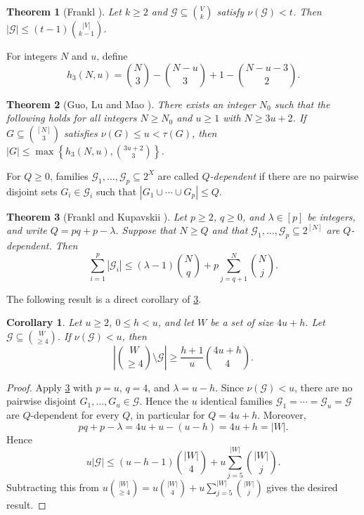 \documentclass[10pt,a4paper]{article}
\numberwithin{equation}{section}
\newtheorem{theorem}{Theorem}[section]
\newtheorem{corollary}[corollary]{Corollary}
\theoremstyle{definition}
\newcommand{\G}{\mathcal G}
\begin{document}
\begin{theorem}[Frankl \cite{FranklShifting1987}]
        \label{thm:frankl-shadow-matching}
        Let $k\ge2$ and $\G\subseteq\binom Vk$ satisfy $\nu(\G)<t$.
        Then $|\G|\le(t-1)\binom {|V|}{k-1}$.
\end{theorem}


For integers $N$ and $u$, define
\[
        h_3(N,u)=\binom N3-\binom{N-u}3+1-\binom{N-u-3}{2}.
\]

\begin{theorem}[Guo, Lu and Mao \cite{GuoLuMao}]\label{thm:GLM}
        There exists an integer $N_0$ such that the following holds for all integers $N\ge N_0$ and $u\ge1$ with $N\ge3u+2$.
        If $G\subseteq\binom{[N]}3$ satisfies $\nu(G)\le u<\tau(G)$, then $|G|\le
                \max\left\{h_3(N,u),\binom{3u+2}{3}\right\}$.
\end{theorem}


For $Q\ge 0$, families $\G_1,\ldots,\G_p\subseteq 2^X$
are called \emph{$Q$-dependent} if there are no pairwise
disjoint sets $G_i\in \G_i$ such that $|G_1\cup\cdots\cup G_p|\le Q$.
\begin{theorem}[Frankl and Kupavskii \cite{FKstability}]
        \label{thm:FK-q-dependent}
        Let $p\ge2$, $q\ge0$, and $\lambda\in[p]$ be integers, and write $Q=pq+p-\lambda$.
        Suppose that $N\ge Q$ and that $\G_1,\ldots,\G_p\subseteq2^{[N]}$ are $Q$-dependent.
        Then
        \[
                \sum_{i=1}^p |\G_i|
                \le
                (\lambda-1)\binom Nq
                +p\sum_{j=q+1}^N\binom Nj .
        \]
\end{theorem}


The following result is a direct corollary of \cref{thm:FK-q-dependent}.
\begin{corollary}
        \label{cor:m3-nonuniform-terminal-blocker}
        Let $u\ge2$, $0\le h<u$, and let $W$ be a set of size $4u+h$.
        Let $\G\subseteq\binom W{\ge4}$.
        If $\nu(\G)<u$, then
        \[
                \left|\binom W{\ge4}\setminus\G\right|
                \ge
                \frac{h+1}{u}\binom{4u+h}{4}.
        \]
\end{corollary}
\begin{proof}
        Apply \cref{thm:FK-q-dependent} with $p=u$, $q=4$, and $\lambda=u-h$.
        Since $\nu(\G)<u$, there are no pairwise disjoint
        $G_1,\ldots,G_u\in\G$.
        Hence the $u$ identical families
        $\G_1=\cdots=\G_u=\G$ are $Q$-dependent for every $Q$,
        in particular for $Q=4u+h$.
        Moreover,
        \[
                pq+p-\lambda=4u+u-(u-h)=4u+h=|W|.
        \]
        Hence
        \[
                u|\G|
                \le
                (u-h-1)\binom{|W|}{4}
                +u\sum_{j=5}^{|W|}\binom{|W|}{j}.
        \]
        Subtracting this from $u\binom{|W|}{\ge4}=u\binom{|W|}{4}+u\sum_{j=5}^{|W|}\binom{|W|}{j}$ gives the desired result.
\end{proof}
\end{document}
